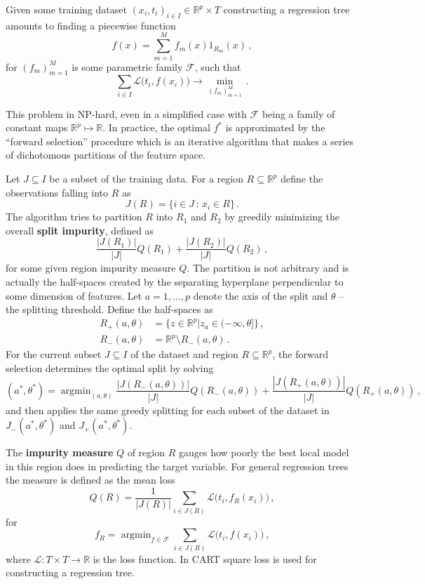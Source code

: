 \documentclass[a4paper]{article}
\newcommand{\Real}{\mathbb{R}}
\newcommand{\argmin}{\mathop{\text{argmin}}}
\newcommand{\Lcal}{\mathcal{L}}
\newcommand{\Fcal}{\mathcal{F}}
\begin{document}
Given some training dataset $(x_i,t_i)_{i\in I} \in \Real^p \times T$ constructing
a regression tree amounts to finding a piecewise function
\[ f(x) = \sum_{m=1}^M f_m( x ) 1_{R_m}(x)\,, \]
for $(f_m)_{m=1}^M$ is some parametric family $\Fcal$, such that
\[ \sum_{i\in I} \Lcal\bigl( t_i, f(x_i) \bigr) \to \min_{(f_m)_{m=1}^M}\,. \]

This problem in NP-hard, even in a simplified case with $\Fcal$ being a family of
constant maps $\Real^p\mapsto \Real$. In practice, the optimal $f^*$ is approximated
by the ``forward selection'' procedure which is an iterative algorithm that makes
a series of dichotomous partitions of the feature space.

Let $J\subseteq I$ be a subset of the training data. For a region $R\subseteq \Real^p$
define the observations falling into $R$ as
\[ J(R) = \{ i\in J\,:\,x_i \in R\} \,. \]
The algorithm tries to partition $R$ into $R_1$ and $R_2$ by greedily minimizing
the overall \textbf{split impurity}, defined as
\[ \frac{|J(R_1)|}{|J|} Q(R_1) + \frac{|J(R_2)|}{|J|} Q(R_2) \,, \]
for some given region impurity measure $Q$. The partition is not arbitrary and is
actually the half-spaces created by the separating hyperplane perpendicular to some
dimension of features. Let $a=1,\ldots,p$ denote the axis of the split and $\theta$
-- the splitting threshold. Define the half-spaces as
\begin{align*}
	R_+(a,\theta) &= \bigl\{ z \in\Real^p \big| z_a \in (-\infty,\theta] \bigr\}\,,\\
	R_-(a,\theta) &= \Real^p \setminus R_-(a,\theta)\,.
\end{align*}
For the current subset $J\subseteq I$ of the dataset and region $R\subseteq \Real^p$,
the forward selection determines the optimal split by solving
\[
(a^*,\theta^*) = \argmin_{(a,\theta)}
  \frac{|J(R_-(a,\theta))|}{|J|} Q( R_-(a,\theta) )
+ \frac{|J(R_+(a,\theta))|}{|J|} Q( R_+(a,\theta) ) \,,
\]
and then applies the same greedy splitting for each subset of the dataset in $J_-(a^*,\theta^*)$
and $J_+(a^*,\theta^*)$.

The \textbf{impurity measure} $Q$ of region $R$ gauges how poorly the best local
model in this region does in predicting the target variable. For general regression
trees the measure is defined as the mean loss
\[ Q(R) = \frac{1}{ |J(R)| } \sum_{i\in J(R)} \Lcal\bigl( t_i, f_R(x_i) \bigr) \,, \]
for 
\[ f_R = \argmin_{f\in \Fcal} \sum_{i\in J(R)} \Lcal\bigl( t_i, f(x_i) \bigr) \,, \]
where $\Lcal:T\times T\to \Real$ is the loss function. In CART square loss is used
for constructing a regression tree.
\end{document}
